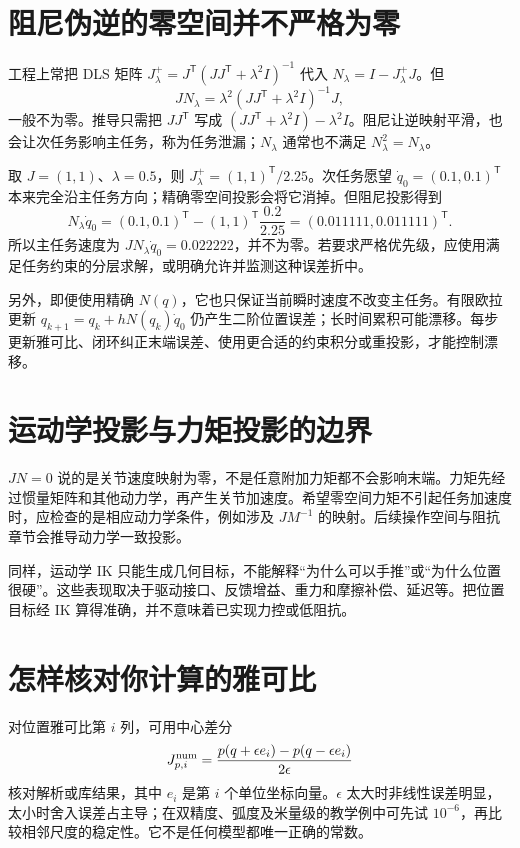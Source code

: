 \section{阻尼伪逆的零空间并不严格为零}
工程上常把 DLS 矩阵 $J_\lambda^+=J^\mathsf T(JJ^\mathsf T+\lambda^2I)^{-1}$ 代入 $N_\lambda=I-J_\lambda^+J$。但
\begin{equation}
 JN_\lambda
 =\lambda^2(JJ^\mathsf T+\lambda^2I)^{-1}J,
\end{equation}
一般不为零。推导只需把 $JJ^\mathsf T$ 写成 $(JJ^\mathsf T+\lambda^2I)-\lambda^2I$。阻尼让逆映射平滑，也会让次任务影响主任务，称为任务泄漏；$N_\lambda$ 通常也不满足 $N_\lambda^2=N_\lambda$。

\begin{examplebox}[算例 阻尼投影后的主任务速度不是零]
取 $J=(1,1)$、$\lambda=0.5$，则 $J_\lambda^+=(1,1)^\mathsf T/2.25$。次任务愿望 $\dot q_0=(0.1,0.1)^\mathsf T$ 本来完全沿主任务方向；精确零空间投影会将它消掉。但阻尼投影得到
\[
 N_\lambda\dot q_0
 =(0.1,0.1)^\mathsf T-(1,1)^\mathsf T\frac{0.2}{2.25}
 =(0.011111,0.011111)^\mathsf T.
\]
所以主任务速度为 $J N_\lambda\dot q_0=0.022222$，并不为零。若要求严格优先级，应使用满足任务约束的分层求解，或明确允许并监测这种误差折中。
\end{examplebox}

另外，即便使用精确 $N(q)$，它也只保证当前瞬时速度不改变主任务。有限欧拉更新 $q_{k+1}=q_k+hN(q_k)\dot q_0$ 仍产生二阶位置误差；长时间累积可能漂移。每步更新雅可比、闭环纠正末端误差、使用更合适的约束积分或重投影，才能控制漂移。

\section{运动学投影与力矩投影的边界}
$JN=0$ 说的是关节速度映射为零，不是任意附加力矩都不会影响末端。力矩先经过惯量矩阵和其他动力学，再产生关节加速度。希望零空间力矩不引起任务加速度时，应检查的是相应动力学条件，例如涉及 $JM^{-1}$ 的映射。后续操作空间与阻抗章节会推导动力学一致投影。

同样，运动学 IK 只能生成几何目标，不能解释“为什么可以手推”或“为什么位置很硬”。这些表现取决于驱动接口、反馈增益、重力和摩擦补偿、延迟等。把位置目标经 IK 算得准确，并不意味着已实现力控或低阻抗。

\section{怎样核对你计算的雅可比}
对位置雅可比第 $i$ 列，可用中心差分
\begin{equation}
 J_{p,i}^{\rm num}
 =\frac{p(q+\epsilon e_i)-p(q-\epsilon e_i)}{2\epsilon}
\end{equation}
核对解析或库结果，其中 $e_i$ 是第 $i$ 个单位坐标向量。$\epsilon$ 太大时非线性误差明显，太小时舍入误差占主导；在双精度、弧度及米量级的教学例中可先试 $10^{-6}$，再比较相邻尺度的稳定性。它不是任何模型都唯一正确的常数。

